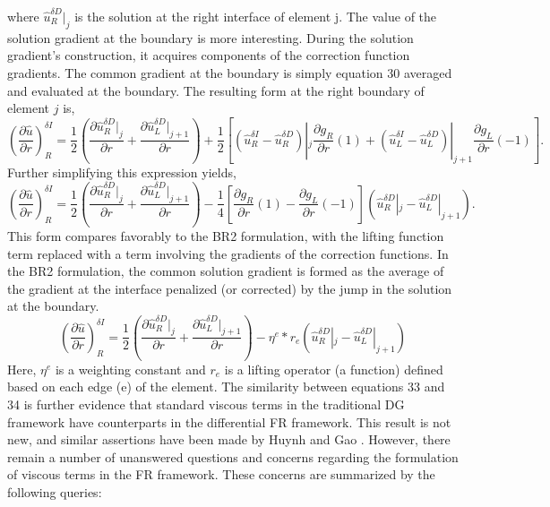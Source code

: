 %
where $\hat{u}^{\delta D}_R |_{j} $ is the solution at the right interface of element j. The value of the solution gradient at the boundary is more interesting. During the solution gradient's construction, it acquires components of the correction function gradients. The common gradient at the boundary is simply equation 30 averaged and evaluated at the boundary. The resulting form at the right boundary of element $j$ is,
%
\begin{equation}
\left (\frac {\partial \hat{u}}{\partial r} \right)_{R}^{\delta I} =  \frac {1}{2} \left( \frac {\partial \hat{u}^{\delta D}_R |_{j}}{\partial r} +  \frac {\partial \hat{u}^{\delta D}_L |_{j+1}}{\partial r} \right) + \frac{1}{2} \left[ (\hat{u}^{\delta I}_R-\hat{u}^{\delta D}_R) |_{j} \frac {\partial g_{R}}{\partial r} (1) + (\hat{u}^{\delta I}_L-\hat{u}^{\delta D}_L) |_{j+1} \frac {\partial g_L}{\partial r} (-1) \right] .
\end{equation}
%
Further simplifying this expression yields,
%
\begin{equation}
\left( \frac {\partial \hat{u}}{\partial r} \right)_{R}^{\delta I} =  \frac {1}{2} \left( \frac {\partial \hat{u}^{\delta D}_R |_{j}}{\partial r} +  \frac {\partial \hat{u}^{\delta D}_L |_{j+1}}{\partial r} \right) - \frac{1}{4} \left[ \frac {\partial g_{R}}{\partial r} (1) -  \frac {\partial g_L}{\partial r} (-1)  \right]  \left( \hat{u}^{\delta D}_R |_{j} - \hat{u}^{\delta D}_L |_{j+1}  \right) .
\end{equation}
%
This form compares favorably to the BR2 formulation, with the lifting function term replaced with a term involving the gradients of the correction functions.  In the BR2 formulation, the common solution gradient is formed as the average of the gradient at the interface penalized (or corrected) by the jump in the solution at the boundary. 
%
\begin{equation}
\left( \frac {\partial \hat{u}}{\partial r} \right)_{R}^{\delta I} =  \frac {1}{2} \left( \frac {\partial \hat{u}^{\delta D}_R |_{j}}{\partial r} +  \frac {\partial \hat{u}^{\delta D}_L |_{j+1}}{\partial r} \right) - \eta^{e} * r_e\left( \hat{u}^{\delta D}_R |_{j} - \hat{u}^{\delta D}_L |_{j+1}  \right)
\end{equation}
%
Here, $\eta^{e}$ is a weighting constant and $r_e$ is a lifting operator (a function) defined based on each edge (e) of the element. The similarity between equations 33 and 34 is further evidence that standard viscous terms in the traditional DG framework have counterparts in the differential FR framework. This result is not new, and similar assertions have been made by Huynh and Gao \cite{Huynh09} \cite{Gao09}. However, there remain a number of unanswered questions and concerns regarding the formulation of viscous terms in the FR framework. These concerns are summarized by the following queries:

